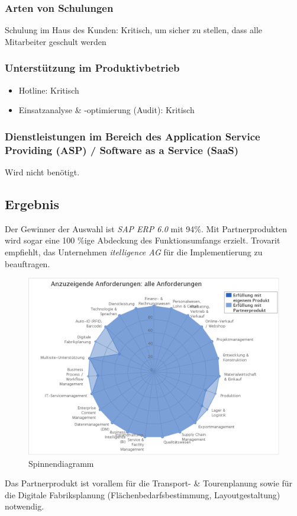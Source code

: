 \subsubsection{Arten von Schulungen}
Schulung im Haus des Kunden: Kritisch, um sicher zu stellen, dass alle Mitarbeiter geschult werden

\subsubsection{Unterstützung im Produktivbetrieb}
\begin{itemize}
	\item Hotline: Kritisch
	\item Einsatzanalyse \& -optimierung (Audit): Kritisch
\end{itemize}

\subsubsection{Dienstleistungen im Bereich des Application Service Providing (ASP) / Software as a Service (SaaS)}
Wird nicht benötigt.
\newpage
\subsection{Ergebnis}
Der Gewinner der Auswahl ist \textit{SAP ERP 6.0} mit 94\%. Mit Partnerprodukten wird sogar eine 100 \%ige Abdeckung des Funktionsumfangs erzielt. Trovarit empfiehlt, das Unternehmen \textit{itelligence AG} für die Implementierung zu beauftragen. 

\begin{figure}[H]
\begin{center}
\includegraphics[width=15cm]{images/chart.png}
\caption{Spinnendiagramm}
\end{center}
\end{figure}
\noindent
Das Partnerprodukt ist vorallem für die Transport- \& Tourenplanung sowie für die Digitale Fabriksplanung (Flächenbedarfsbestimmung, Layoutgestaltung) notwendig.
